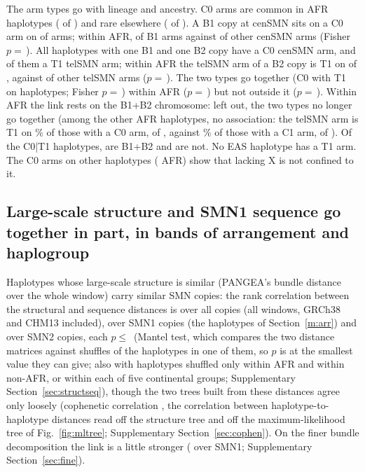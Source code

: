 \documentclass[10pt]{article}
\begin{document}
The arm types go with lineage and ancestry. C0 arms are common in AFR haplotypes (\elCZeroAfr{} of \elAfrHaps) and
rare elsewhere (\elCZeroNonAfr{} of \elNonAfrHaps). A B1 copy at cenSMN sits on a C0 arm on \elBoneCZero{} of
\elBoneCen{} arms; within AFR, \elAfrBoneCZero{} of \elAfrBoneCen{} B1 arms against \elAfrOthCZero{} of \elAfrOthCen{}
other cenSMN arms (Fisher $p=$\,\elAfrBoneP). All \elBB{} haplotypes with one B1 and one B2 copy have a C0 cenSMN arm,
and \elBBTOne{} of them a T1 telSMN arm; within AFR the telSMN arm of a B2 copy is T1 on \elAfrBtwoTOne{} of
\elAfrBtwoTel, against \elAfrOthTOne{} of \elAfrOthTel{} other telSMN arms ($p=$\,\elAfrBtwoP). The two types go
together (C0 with T1 on \elFzeroone{} haplotypes; Fisher $p=$\,\elFormP) within AFR ($p=$\,\elFormAfrP) but not
outside it ($p=$\,\elFormNonAfrP). Within AFR the link rests on the B1+B2 chromosome: left out, the two types no longer go together
(among the other \elFormAfrNoBBn{} AFR haplotypes, no association: the telSMN arm is T1 on \elFormAfrNoBBzPct\% of those with a C0 arm, \elFormAfrNoBBzt{} of \elFormAfrNoBBzN, against \elFormAfrNoBBoPct\% of those with a C1 arm, \elFormAfrNoBBot{} of \elFormAfrNoBBoN). Of the \elFzeroone{} C0|T1 haplotypes, \elFzerooneBB{} are B1+B2 and \elFzerooneNotBB{} are not. No EAS haplotype has a T1 arm.
The \elCZeroNotBB{} C0 arms on other haplotypes (\elCZeroNotBBAfr{} AFR) show that lacking X is not confined to it.

\subsection{Large-scale structure and SMN1 sequence go together in part, in bands of arrangement and haplogroup}\label{m:struct}
Haplotypes whose large-scale structure is similar (PANGEA's bundle distance over the whole window) carry similar SMN
copies: the rank correlation between the structural and sequence distances is \mantelAll{} over all copies (all \tsAllN{} windows, GRCh38 and CHM13 included), \mOneR{}
over SMN1 copies (the \mlbHaps{} haplotypes of Section~\ref{m:arr}) and \mTwoR{} over SMN2 copies, each $p\le$\,\mantelP{} (Mantel test, which compares the two distance matrices against \nPerm{} shuffles of the haplotypes in one of them, so $p$ is at the smallest value they can give; also with haplotypes shuffled only
within AFR and within non-AFR, or within each of five continental groups; Supplementary Section~\ref{sec:structseq}), though the two trees built from these distances
agree only loosely (cophenetic correlation \cophenetic, the correlation between haplotype-to-haplotype distances read off the structure tree and off the maximum-likelihood tree of Fig.~\ref{fig:mltree}; Supplementary Section~\ref{sec:cophen}). On the finer bundle
decomposition the link is a little stronger (\tsOneF{} over SMN1;
Supplementary Section~\ref{sec:fine}).
\end{document}
